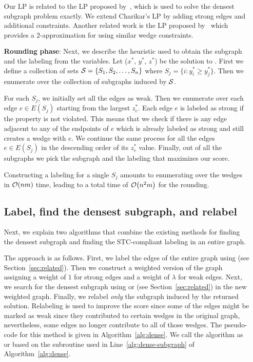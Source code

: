 Our LP is related to the LP proposed  by~\citet{charikar2000greedy}, which is used to solve the densest subgraph problem exactly. 
We extend Charikar's LP by adding strong edges and additional \stc constraints.
Another related work is the LP proposed by~\citet{adriaens2020relaxing} which provides a $2$-approximation for \prbminSTC using similar wedge constraints.

\textbf{Rounding phase}:
Next, we describe the heuristic used to obtain the subgraph and the labeling from the variables. 
Let ($x^*$, $y^*$, $z^*$) be the solution to \prbstrwkr.
First we define a collection of sets ${\mathcal S} =\{S_1, S_2, \ldots , S_n\}$ where $S_j = \{ i: y^{*}_i \geq  y_j^{*}\}$.
Then we enumerate over the collection of subgraphs induced by ${\mathcal S}$. 

For each $S_j$, we initially set all the edges as weak. Then we enumerate over each edge $e \in E(S_j)$ starting from the largest $z_{e}^*$. Each edge $e$ is labeled as strong if the \stc property is not violated. This means that we check if there is any edge adjacent to any of the endpoints of $e$ which is already labeled as strong and still creates a wedge with $e$. We continue the same process for all the edges $e \in E(S_j)$ in the descending order of its $z_{e}^*$ value. Finally, out of all the subgraphs we pick the subgraph and the labeling that maximizes our score.

Constructing a labeling for a single $S_j$ amounts to enumerating over the wedges in $\bigO{nm}$ time, leading to a total time of $\bigO{n^2m}$ for the rounding.

\subsection{Label, find the densest subgraph, and relabel} \label{sec:stc-dense}
Next, we explain two algorithms that combine the existing methods for finding the densest subgraph and finding the STC-compliant labeling in an entire graph.

The approach is as follows.
First, we label the edges of the entire graph using \algminstc (see Section~\ref{sec:related}). Then we construct a weighted version of the graph assigning a weight of $1$ for strong edges and a weight of $\lambda$ for weak edges. Next, we search for the densest subgraph using \algdg or \algdc (see Section~\ref{sec:related}) in the new weighted graph.  
Finally, we relabel {\em only} the subgraph induced by the returned solution. Relabeling is used to improve the score since some of the edges might be marked as weak since they contributed to certain wedges in the original graph, nevertheless, some edges no longer contribute to all of those wedges.
The pseudo-code for this method is given in Algorithm~\ref{alg:dense}. We call the algorithm as \algdenseg or \algdensec
based on the subroutine used in Line~\ref{alg:dense-subgraph} of Algorithm~\ref{alg:dense}.

